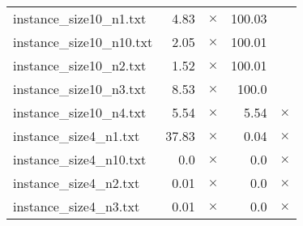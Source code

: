 \documentclass{article}
\begin{document}
\begin{center}
\begin{tabular}{lrrrr}
instance\_size10\_n1.txt & 4.83 & 
$\times$
 & 100.03 & 
\\
instance\_size10\_n10.txt & 2.05 & 
$\times$
 & 100.01 & 
\\
instance\_size10\_n2.txt & 1.52 & 
$\times$
 & 100.01 & 
\\
instance\_size10\_n3.txt & 8.53 & 
$\times$
 & 100.0 & 
\\
instance\_size10\_n4.txt & 5.54 & 
$\times$
 & 5.54 & 
$\times$
\\
instance\_size4\_n1.txt & 37.83 & 
$\times$
 & 0.04 & 
$\times$
\\
instance\_size4\_n10.txt & 0.0 & 
$\times$
 & 0.0 & 
$\times$
\\
instance\_size4\_n2.txt & 0.01 & 
$\times$
 & 0.0 & 
$\times$
\\
instance\_size4\_n3.txt & 0.01 & 
$\times$
 & 0.0 & 
$\times$
\\
\hline\end{tabular}
\end{center}
\end{document}
